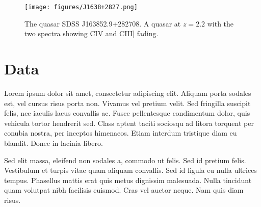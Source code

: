 \documentclass[a4paper,fleqn,usenatbib]{mnras}
\begin{document}
\begin{figure}
  \centering
  \texttt{[image: figures/J1638+2827.png]}
  \vspace{-12pt}
  \caption[]{The quasar SDSS J163852.9+282708. 
A quasar at $z = 2.2$ with the two spectra showing CIV and CIII] fading.}
  \label{fig:disk_suppression}
\end{figure}
\fi



\section{Data}
Lorem ipsum dolor sit amet, consectetur adipiscing elit. Aliquam porta
sodales est, vel cursus risus porta non. Vivamus vel pretium
velit. Sed fringilla suscipit felis, nec iaculis lacus convallis
ac. Fusce pellentesque condimentum dolor, quis vehicula tortor
hendrerit sed. Class aptent taciti sociosqu ad litora torquent per
conubia nostra, per inceptos himenaeos. Etiam interdum tristique diam
eu blandit. Donec in lacinia libero.

Sed elit massa, eleifend non sodales a, commodo ut felis. Sed id
pretium felis. Vestibulum et turpis vitae quam aliquam convallis. Sed
id ligula eu nulla ultrices tempus. Phasellus mattis erat quis metus
dignissim malesuada. Nulla tincidunt quam volutpat nibh facilisis
euismod. Cras vel auctor neque. Nam quis diam risus.
\end{document}
